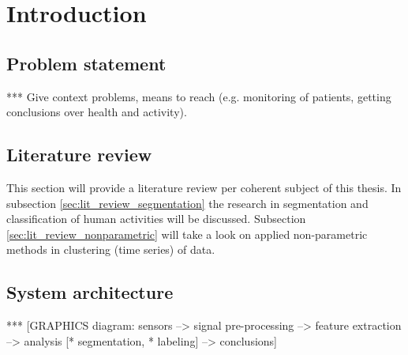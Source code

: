 
\chapter{Introduction} %

\label{Chapter1} %



\section{Problem statement}
*** Give context problems, means to reach (e.g. monitoring of patients,  getting conclusions over health and activity).

\section{Literature review}
This section will provide a literature review per coherent subject of this thesis.
In subsection \ref{sec:lit_review_segmentation} the research in segmentation and classification of human activities will be discussed.
Subsection \ref{sec:lit_review_nonparametric} will take a look on applied non-parametric methods in clustering (time series) of data.











\section{System architecture}

*** [GRAPHICS diagram: sensors --> signal pre-processing --> feature extraction --> analysis [* segmentation, * labeling] --> conclusions]


